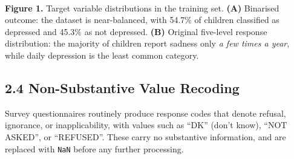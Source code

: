 \documentclass[11pt]{article}
\begin{document}
    \begin{center}
    \end{center}
    { \hspace*{\fill} \\}
    
    \textbf{Figure 1.} Target variable distributions in the training set.
\textbf{(A)} Binarised outcome: the dataset is near-balanced, with
54.7\% of children classified as depressed and 45.3\% as not depressed.
\textbf{(B)} Original five-level response distribution: the majority of
children report sadness only \emph{a few times a year}, while daily
depression is the least common category.

    \hypertarget{non-substantive-value-recoding}{%
\subsection{2.4 Non-Substantive Value
Recoding}\label{non-substantive-value-recoding}}

Survey questionnaires routinely produce response codes that denote
refusal, ignorance, or inapplicability, with values such as ``DK''
(don't know), ``NOT ASKED'', or ``REFUSED''. These carry no substantive
information, and are replaced with \texttt{NaN} before any further
processing.
\end{document}
